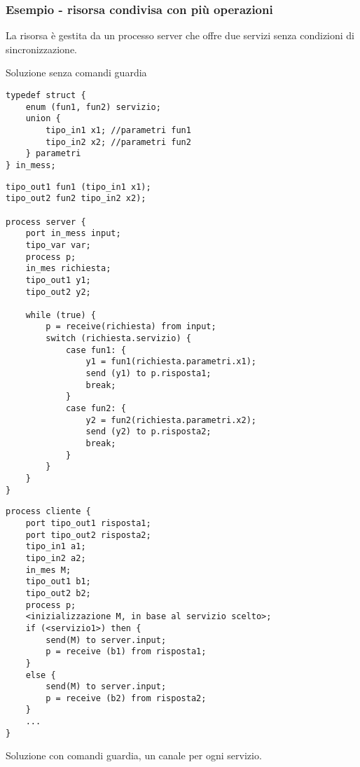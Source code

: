 \subsubsection{Esempio - risorsa condivisa con più operazioni}
La risorsa è gestita da un processo server che offre due servizi senza condizioni di sincronizzazione.

Soluzione senza comandi guardia

\begin{verbatim}
typedef struct {
    enum (fun1, fun2) servizio;
    union {
        tipo_in1 x1; //parametri fun1
        tipo_in2 x2; //parametri fun2
    } parametri
} in_mess;
\end{verbatim}

\begin{verbatim}
tipo_out1 fun1 (tipo_in1 x1);
tipo_out2 fun2 tipo_in2 x2);

process server {
    port in_mess input;
    tipo_var var;
    process p;
    in_mes richiesta;
    tipo_out1 y1;
    tipo_out2 y2;

    while (true) {
        p = receive(richiesta) from input;
        switch (richiesta.servizio) {
            case fun1: {
                y1 = fun1(richiesta.parametri.x1);
                send (y1) to p.risposta1;
                break;
            }
            case fun2: { 
                y2 = fun2(richiesta.parametri.x2);
                send (y2) to p.risposta2;
                break;
            }
        }
    }
}

\end{verbatim}

\begin{verbatim}
process cliente {
    port tipo_out1 risposta1;
    port tipo_out2 risposta2;
    tipo_in1 a1;
    tipo_in2 a2;
    in_mes M;
    tipo_out1 b1;
    tipo_out2 b2;
    process p;
    <inizializzazione M, in base al servizio scelto>;
    if (<servizio1>) then {
        send(M) to server.input;
        p = receive (b1) from risposta1;
    }
    else {
        send(M) to server.input;
        p = receive (b2) from risposta2;
    }
    ...
}
\end{verbatim}

Soluzione con comandi guardia, un canale per ogni servizio.

